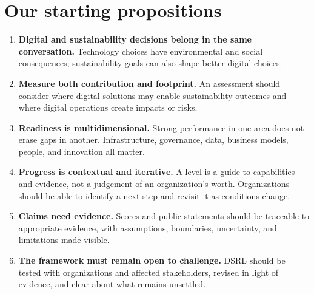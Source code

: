 \documentclass[11pt,a4paper]{article}
\begin{document}
\section*{Our starting propositions}
\begin{enumerate}
  \item \textbf{Digital and sustainability decisions belong in the same conversation.} Technology choices have environmental and social consequences; sustainability goals can also shape better digital choices.
  \item \textbf{Measure both contribution and footprint.} An assessment should consider where digital solutions may enable sustainability outcomes and where digital operations create impacts or risks.
  \item \textbf{Readiness is multidimensional.} Strong performance in one area does not erase gaps in another. Infrastructure, governance, data, business models, people, and innovation all matter.
  \item \textbf{Progress is contextual and iterative.} A level is a guide to capabilities and evidence, not a judgement of an organization's worth. Organizations should be able to identify a next step and revisit it as conditions change.
  \item \textbf{Claims need evidence.} Scores and public statements should be traceable to appropriate evidence, with assumptions, boundaries, uncertainty, and limitations made visible.
  \item \textbf{The framework must remain open to challenge.} DSRL should be tested with organizations and affected stakeholders, revised in light of evidence, and clear about what remains unsettled.
\end{enumerate}
\end{document}
